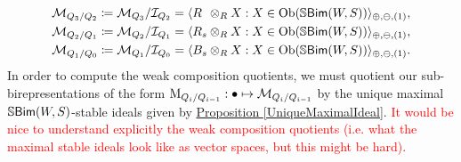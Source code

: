 \begin{example}
\begin{align*}
\begin{split}
\mathcal{M}_{Q_3/Q_2} \coloneqq \mathcal{M}_{Q_3}/\mathcal{I}_{Q_2} = \langle R\hphantom{{}_{s}} \otimes_R X : X \in \obset(\mathbb{S}\textcat{Bim}(W, S))\rangle_{\oplus,\ominus,(1)},\\
\mathcal{M}_{Q_2/Q_1} \coloneqq \mathcal{M}_{Q_2}/\mathcal{I}_{Q_1} = \langle R_{s} \otimes_R X : X \in \obset(\mathbb{S}\textcat{Bim}(W, S))\rangle_{\oplus,\ominus,(1)},\\
\mathcal{M}_{Q_1/Q_0} \coloneqq \mathcal{M}_{Q_1}/\mathcal{I}_{Q_0} = \langle B_{s} \otimes_R X : X \in \obset(\mathbb{S}\textcat{Bim}(W, S))\rangle_{\oplus,\ominus,(1)}.
\end{split}
\end{align*}
\noindent In order to compute the weak composition quotients, we must quotient our sub-birepresentations of the form $\textnormal{M}_{Q_i/Q_{i-1}} : \bullet \mapsto \mathcal{M}_{Q_i/Q_{i-1}}$ by the unique maximal $\mathbb{S}\textnormal{\textsf{Bim}}(W, S)$-stable ideals given by \hyperref[UniqueMaximalIdeal]{Proposition \ref*{UniqueMaximalIdeal}}. \textcolor{red}{It would be nice to understand explicitly the weak composition quotients (i.e. what the maximal stable ideals look like as vector spaces, but this might be hard).}
\end{example}

